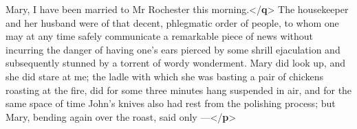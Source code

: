 \documentclass[11pt,twoside]{article}\makeatletter
\begin{document}
\begin{shaded}
\hspace*{1em}Mary, I have been married to Mr Rochester this\mbox{}\newline 
\hspace*{1em}\hspace*{1em}\hspace*{1em}\hspace*{1em} morning.{</\textbf{q}>} The housekeeper and her husband were of that\mbox{}\newline 
\hspace*{1em}\hspace*{1em} decent, phlegmatic order of people, to whom one may at any\mbox{}\newline 
\hspace*{1em}\hspace*{1em} time safely communicate a remarkable piece of news without\mbox{}\newline 
\hspace*{1em}\hspace*{1em} incurring the danger of having one's ears pierced by some\mbox{}\newline 
\hspace*{1em}\hspace*{1em} shrill ejaculation and subsequently stunned by a torrent of\mbox{}\newline 
\hspace*{1em}\hspace*{1em} wordy wonderment. Mary did look up, and she did stare at\mbox{}\newline 
\hspace*{1em}\hspace*{1em} me; the ladle with which she was basting a pair of chickens\mbox{}\newline 
\hspace*{1em}\hspace*{1em} roasting at the fire, did for some three minutes hang\mbox{}\newline 
\hspace*{1em}\hspace*{1em} suspended in air, and for the same space of time John's\mbox{}\newline 
\hspace*{1em}\hspace*{1em} knives also had rest from the polishing process; but Mary,\mbox{}\newline 
\hspace*{1em}\hspace*{1em} bending again over the roast, said only —{</\textbf{p}>}\mbox{}\newline 

\end{shaded}
\end{document}
